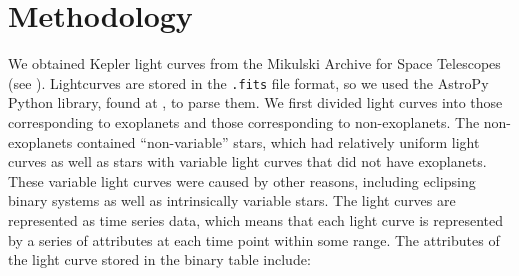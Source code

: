 \documentclass{amsart}
\begin{document}
\section{Methodology}
We obtained Kepler light curves from the Mikulski Archive for Space Telescopes (see \cite{mast}). Lightcurves are stored in the \texttt{.fits} file format, so we used the AstroPy Python library, found at \cite{AstroPy}, to parse them. We first divided light curves into those corresponding to exoplanets and those corresponding to non-exoplanets. The non-exoplanets contained ``non-variable'' stars, which had relatively uniform light curves as well as stars with variable light curves that did not have exoplanets. These variable light curves were caused by other reasons, including eclipsing binary systems as well as intrinsically variable stars. The light curves are represented as time series data, which means that each light curve is represented by a series of attributes at each time point within some range. The attributes of the light curve stored in the binary table include:
\end{document}
